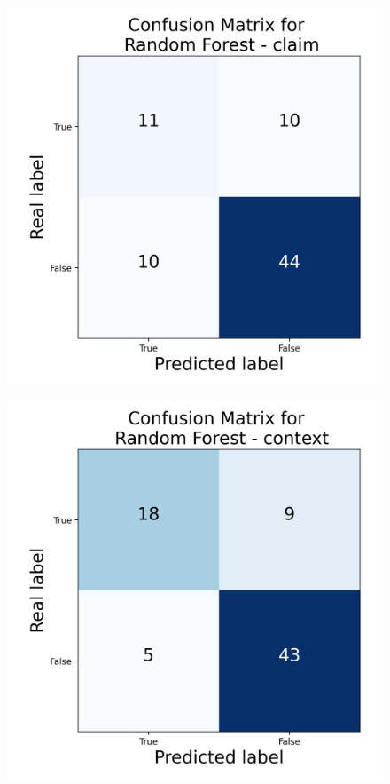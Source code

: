 \begin{figure}[h]
    \centering
    \begin{minipage}[b]{0.3\textwidth}
        \centering
        \includegraphics[width=\textwidth]{images/confusion_3.json-Random Forest_claim_confusion_matrix}
        \label{fig:confusion_3_1}
    \end{minipage}
    \hspace{1em}
    \begin{minipage}[b]{0.3\textwidth}
        \centering
        \includegraphics[width=\textwidth]{images/confusion_3.json-Random Forest_context_confusion_matrix}

\end{minipage}
\end{figure}
